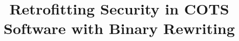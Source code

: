 \documentclass[11 pt]{article}
\begin{document}
\title{ \bfseries Retrofitting Security in COTS Software with Binary Rewriting}
\date{}
\maketitle











\end{document}
